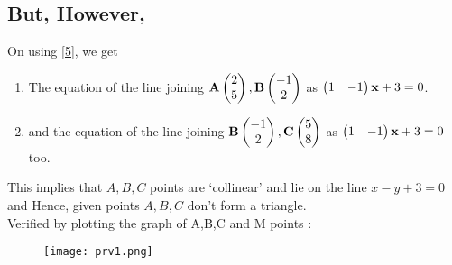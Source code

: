 \documentclass[journal,12pt,twocolumn]{IEEEtran}
\begin{document}
\subsection*{But, However,} On using \eqref{5}, we get
\newline
\begin{enumerate}
    \item The equation of the line joining $\mathbf{A}\begin{pmatrix}2\\5\end{pmatrix}, \mathbf{B}\begin{pmatrix}-1\\2\end{pmatrix}$ as $\begin{pmatrix}1 & - 1\end{pmatrix}\mathbf{x} + 3 = 0$. 
    \newline
    \item and the equation of the line joining $\mathbf{B}\begin{pmatrix}-1\\2\end{pmatrix}, \mathbf{C}\begin{pmatrix}5\\8\end{pmatrix}$ as $\begin{pmatrix}1 & - 1\end{pmatrix}\mathbf{x} + 3 = 0$ too.\newline
\end{enumerate}

 This implies that $A,B,C$ points are `collinear' and lie on the line $x-y+3=0$ and Hence, given points $A,B,C$ don't form a triangle.\newline\\
Verified by plotting the graph of A,B,C and M points :
\begin{figure}[ht!]
\centering
\texttt{[image: prv1.png]}
\end{figure}
 
\end{document}
